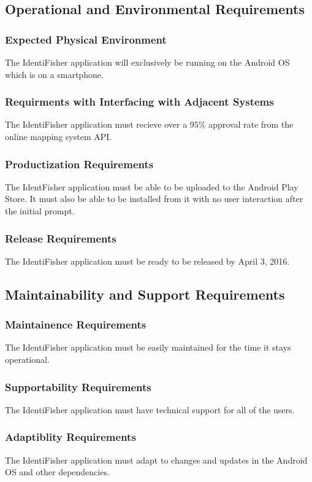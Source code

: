 \documentclass{article}
\begin{document}
\subsection{Operational and Environmental Requirements}
\subsubsection{Expected Physical Environment}
The IdentiFisher application will exclusively be running on the Android OS which is on a smartphone.
\subsubsection{Requirments with Interfacing with Adjacent Systems}
The IdentiFisher application must recieve over a 95\% approval rate from the online mapping system API.
\subsubsection{Productization Requirements}
The IdentFisher application must be able to be uploaded to the Android Play Store. It must also be able to be installed from it with no user interaction after the initial prompt.
\subsubsection{Release Requirements}
The IdentiFisher application must be ready to be released by April 3, 2016.

\subsection{Maintainability and Support Requirements}
\subsubsection{Maintainence Requirements}
The IdentiFisher application must be easily maintained for the time it stays operational.
\subsubsection{Supportability Requirements}
The IdentiFisher application must have technical support for all of the users.
\subsubsection{Adaptiblity Requirements}
The IdentiFisher application must adapt to changes and updates in the Android OS and other dependencies.
\end{document}

